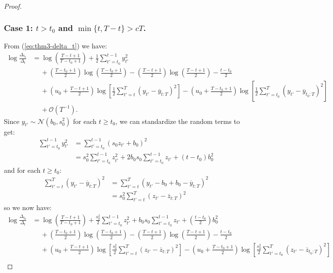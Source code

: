 \begin{proof}
\subsubsection*{Case 1: $t > t_0$ and $\min\{t, T-t\} > cT$.}

From (\ref{eq:thm3-delta_t}) we have:
\begin{align*}
    \log \frac{\Delta_{t_0}}{\Delta_t} &= \log \left(\frac{T - t + 1}{T - t_0 +1} \right) + \frac{1}{2} \sum_{t' = t_0}^{t - 1} y_{t'}^2 \\
    &\quad\: + \left(\frac{T - t_0 + 1}{2}\right) \log\left(\frac{T-t_0+1}{2}\right) - \left(\frac{T - t + 1}{2}\right) \log\left(\frac{T-t+1}{2}\right) - \frac{t-t_0}{2} \\
    &\quad\: + \left(u_0 + \frac{T - t +1}{2}\right)\log\left[ \frac{1}{2}\sum_{t'=t}^T (y_{t'} - \overline{y}_{t:T})^2 \right]  - \left(u_0 + \frac{T - t_0 +1}{2}\right)\log\left[\frac{1}{2}\sum_{t'=t_0}^T (y_{t'} - \overline{y}_{t_0:T})^2 \right] \\
    &\quad\: + \mathcal{O}(T^{-1}) .
\end{align*}
Since $y_{t'} \sim \mathcal{N}(b_0,s_0^2)$ for each $t \geq t_0$, we can standardize the random terms to get:
\begin{align*}
    \sum_{t' = t_0}^{t - 1} y_{t'}^2 &= \sum_{t' = t_0}^{t - 1} (s_0z_{t'} + b_0)^2 \\
    &= s_0^2 \sum_{t' = t_0}^{t - 1} z_{t'}^2 + 2 b_0 s_0 \sum_{t' = t_0}^{t - 1} z_{t'} + (t-t_0)b_0^2
\end{align*}
and for each $t \geq t_0$:
\begin{align*}
    \sum_{t'=t}^T (y_{t'} - \overline{y}_{t:T})^2 &= \sum_{t'=t}^T (y_{t'} - b_0 + b_0 - \overline{y}_{t:T})^2 \\
    &= s_0^2\sum_{t'=t}^T (z_{t'} - \overline{z}_{t:T})^2 
\end{align*}
so we now have:
\begin{align*}
    \log \frac{\Delta_{t_0}}{\Delta_t} &= \log \left(\frac{T - t + 1}{T - t_0 +1} \right) + \frac{s_0^2}{2} \sum_{t' = t_0}^{t - 1} z_{t'}^2 + b_0 s_0 \sum_{t' = t_0}^{t - 1} z_{t'} + \left(\frac{t-t_0}{2}\right)b_0^2 \\
    &\quad\: + \left(\frac{T - t_0 + 1}{2}\right) \log\left(\frac{T-t_0+1}{2}\right) - \left(\frac{T - t + 1}{2}\right) \log\left(\frac{T-t+1}{2}\right) - \frac{t-t_0}{2} \\
    &\quad\: + \left(u_0 + \frac{T - t +1}{2}\right)\log\left[ \frac{s_0^2}{2}\sum_{t'=t}^T (z_{t'} - \overline{z}_{t:T})^2 \right]  - \left(u_0 + \frac{T - t_0 +1}{2}\right)\log\left[\frac{s_0^2}{2}\sum_{t'=t_0}^T (z_{t'} - \overline{z}_{t_0:T})^2 \right] \\

\end{align*}
\end{proof}
